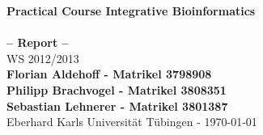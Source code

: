 \begin{titlepage}
\begin{center}
  \vspace*{.2\textheight}
  \LARGE{\textbf{Practical Course Integrative Bioinformatics}} \\
  \vspace{4.5cm}
  \Large{\textbf{\\-- Report --}} \\
  \vspace{0.15cm}
  \Large{WS 2012/2013} \\
  \vspace{2.25cm}
  \Large{\textbf{Florian Aldehoff - Matrikel 3798908\\
		Philipp Brachvogel - Matrikel 3808351\\
		Sebastian Lehnerer - Matrikel 3801387\\}}
  \vspace{0.5cm}
  \Large{Eberhard Karls Universität Tübingen - \today}
\end{center}
\end{titlepage}
 